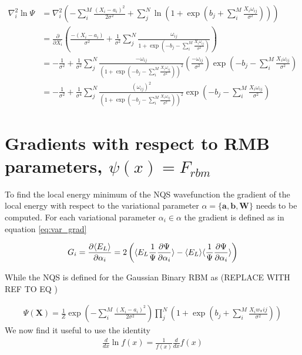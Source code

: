 \begin{align*}
\nabla_i^2 \ln \Psi &= \nabla_i^2 \left( - \sum_{i}^{M} \frac{(X_i - a_i)^2}{2 \sigma^2} +  \sum_{j}^{N} \ln \left( 1 + \exp \left( b_j + \sum_{i}^{M} \frac{X_i \omega_{ij}}{\sigma^2} \right) \right) \right) \\
&= \frac{\partial}{\partial X_i} \left( \frac{-(X_i - a_i)}{\sigma^2} + \frac{1}{\sigma^2} \sum_{j}^{N} \frac{\omega_{ij}}{1 + \exp \left( -b_j - \sum_{i}^{M} \frac{X_i \omega_{ij}}{\sigma^2} \right)} \right) \\
&= -\frac{1}{\sigma^2} + \frac{1}{\sigma^2} \sum_{j}^{N} \frac{-\omega_{ij}}{\left(1 + \exp \left( -b_j - \sum_{i}^{M} \frac{X_i \omega_{ij}}{\sigma^2} \right)\right)^2} \left( \frac{-\omega_{ij}}{\sigma^2} \right) \exp \left( -b_j - \sum_{i}^{M} \frac{X_i \omega_{ij}}{\sigma^2} \right) \\
&= -\frac{1}{\sigma^2} + \frac{1}{\sigma^4} \sum_{j}^{N} \frac{\left(\omega_{ij}\right)^2  }{\left(1 + \exp \left( -b_j - \sum_{i}^{M} \frac{X_i \omega_{ij}}{\sigma^2} \right)\right)^2}\exp \left( -b_j - \sum_{i}^{M} \frac{X_i \omega_{ij}}{\sigma^2} \right) 
\end{align*}

\section{Gradients with respect to RMB parameters, $\psi(x) = F_{rbm}$}

To find the local energy minimum of the NQS wavefunction the  gradient of the local energy with respect to the variational parameter $\alpha  = \{\mathbf{a}, \mathbf{b}, \mathbf{W} \}$ needs to be computed. For each variational parameter $\alpha_i \in \alpha$ the gradient is defined as in equation \ref{eq:var_grad} 

\begin{equation}\label{eq:var_grad}
G_i = \frac{\partial \langle E_L \rangle}{\partial \alpha_i} = 2\left( \langle E_L \frac{1}{\Psi} \frac{\partial \Psi}{\partial \alpha_i} \rangle  - \langle E_L \rangle \langle  \frac{1}{\Psi} \frac{\partial \Psi}{\partial \alpha_i} \rangle\right)    
\end{equation}

\noindent While the NQS is defined for the Gaussian Binary RBM as (REPLACE WITH REF TO EQ )

\begin{align}
    \Psi (\mathbf{X}) = \frac{1}{Z} \exp\left(-\sum_i^M \frac{(X_i - a_i)^2}{2\sigma^2}\right) 
    \prod_j ^N \left( 1 + \exp\left(b_j  + \sum_i^M \frac{X_i w_^\mathbf{T}{ij}}{\sigma^2}\right) \right)
\end{align}
\noindent We now find it useful to use the identity 
\begin{align}
    \frac{d}{dx}\ln f(x) = \frac{1}{f(x)} \frac{d}{dx}f(x)
\end{align}

